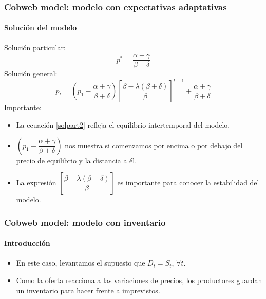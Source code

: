 \documentclass[11pt]{beamer}
\begin{document}
\begin{frame}
	\frametitle{Cobweb model: modelo con expectativas adaptativas}
	\framesubtitle{Solución del modelo}	
	Solución particular:
	\begin{equation}\label{solpart2}
	p^{*}=\dfrac{\alpha+\gamma}{\beta+\delta}
	\end{equation}
	Solución general:
	\begin{equation}
	p_t=\left( p_1-\dfrac{\alpha+\gamma}{\beta+\delta}\right) \left[ \dfrac{\beta-\lambda(\beta+\delta)}{\beta}\right]^{t-1}+
	\dfrac{\alpha+\gamma}{\beta+\delta} 
	\end{equation}
	Importante:
	\begin{itemize}
		\scriptsize	\item La ecuación \ref{solpart2} refleja el equilibrio intertemporal del modelo.
		\item $\left( p_1-\dfrac{\alpha+\gamma}{\beta+\delta}\right)$ nos muestra si comenzamos por encima o por debajo del precio de equilibrio y la distancia a él.
		\item La expresión $\left[ \dfrac{\beta-\lambda(\beta+\delta)}{\beta}\right]$ es importante para conocer la estabilidad del modelo.
	\end{itemize}
\end{frame}

\begin{frame}
	\frametitle{Cobweb model: modelo con inventario}
\framesubtitle{Introducción}	
	\begin{itemize}
		\item En este caso, levantamos el supuesto que $D_t=S_t$, $\forall t$.
		\item Como la oferta reacciona a las variaciones de precios, los productores guardan un inventario para hacer frente a imprevistos.
	\end{itemize}
\end{frame}
\end{document}

